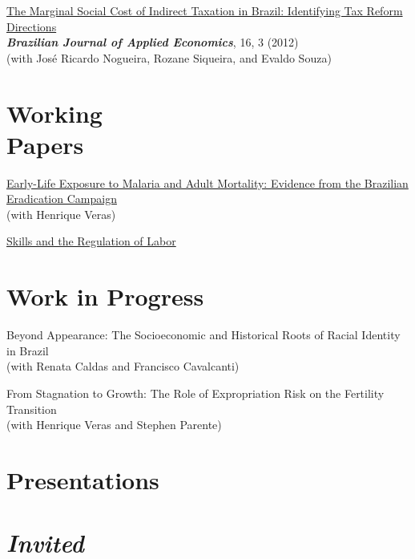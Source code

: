 \documentclass[mm, 10pt]{simple_style}
\begin{document}
\begin{resume}
\href{https://www.scielo.br/scielo.php?pid=S1413-80502012000300001&script=sci_arttext}{The Marginal Social Cost of Indirect Taxation in Brazil: Identifying Tax Reform Directions} \\
\textbf{\textit{Brazilian Journal of Applied Economics}}, 16, 3 (2012) \\
(with Jos\'e Ricardo Nogueira, Rozane Siqueira, and Evaldo Souza)



\section{Working \\ Papers}

\href{https://drive.google.com/file/d/1dIZK5thBKYu-IsduU5E65SdG_z4sQW8h/view}{Early-Life Exposure to Malaria and Adult Mortality: Evidence from the Brazilian Eradication Campaign}\\
(with Henrique Veras)

\href{https://www.usf.edu/arts-sciences/departments/economics/documents/wpaper/2025-03.pdf}{Skills and the Regulation of Labor}

\section{Work in Progress}

Beyond Appearance: The Socioeconomic and Historical Roots of Racial Identity in Brazil \\
(with Renata Caldas and Francisco Cavalcanti) 

From Stagnation to Growth: The Role of Expropriation Risk on the Fertility Transition\\
(with Henrique Veras and Stephen Parente)



\section{Presentations \\ {\protect\footnotesize {} \\ \emph{Invited}}}


\end{resume}
\end{document}
